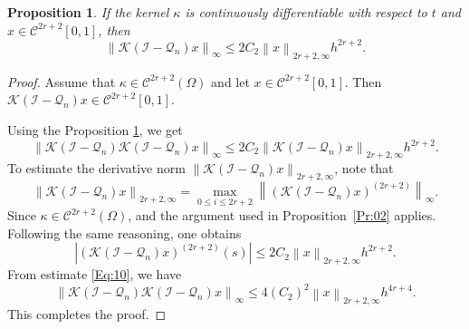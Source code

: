 \documentclass[10pt,a4paper]{amsart}
\newtheorem{proposition}{Proposition}
\newcommand{\norm}[1]{\left\lVert #1\right\rVert}
\begin{document}
\begin{proposition} \label{Pr:01}
	If the kernel  $\kappa$ is continuously differentiable with respect to $t$ 
	and \(x \in \mathcal{C}^{2r+2}[0,1]\), then
	\[
	\norm{\mathcal{K}(\mathcal{I} - \mathcal{Q}_n)x }_\infty 
	\le 2C_2 \norm{x}_{2r+2, \infty} h^{2r + 2}.
	\]
\end{proposition}

\begin{proof}
	Assume that $\kappa \in \mathcal{C}^{2r+2}(\Omega)$ and let
	$x \in \mathcal{C}^{2r+2}[0,1]$. Then
	$
	\mathcal{K}(\mathcal{I}-\mathcal{Q}_n)x \in \mathcal{C}^{2r+2}[0,1].
	$
	
	\noindent
	Using the Proposition \ref{Pr:01}, we get
	\begin{equation}\label{Eq:10}	
		\norm{\mathcal{K}(\mathcal{I} - \mathcal{Q}_n)\mathcal{K}(\mathcal{I} - \mathcal{Q}_n)x}_\infty \le 2C_2 \norm{\mathcal{K}(\mathcal{I} - \mathcal{Q}_n)x}_{2r+2,\infty} h^{2r+2}.  
	\end{equation}
	To estimate the derivative norm $\norm{\mathcal{K}(\mathcal{I}-\mathcal{Q}_n)x}_{2r+2,\infty}$, 
	note that
	\begin{equation*} 
		\norm{\mathcal{K}(\mathcal{I} - \mathcal{Q}_n)x}_{2r+2,\infty} = \max_{0 \leq i \leq 2r + 2} \norm{\left(\mathcal{K}(\mathcal{I} - \mathcal{Q}_n)x\right)^{(2r+2)}}_\infty.
	\end{equation*}
	Since $\kappa \in \mathcal{C}^{2r+2}(\Omega)$, and the argument used in Proposition~\ref{Pr:02} applies. 
	Following the same reasoning, one obtains
	\begin{equation*}
		\left|\left(\mathcal{K}(\mathcal{I} - \mathcal{Q}_n)x\right)^{(2r+2)}(s)\right| \le  2 C_2 \norm{x}_{2r +2, \infty} h^{2r + 2}.
	\end{equation*}
	From estimate \eqref{Eq:10}, we have
	\begin{equation*}	
		\norm{\mathcal{K}(\mathcal{I} - \mathcal{Q}_n)\mathcal{K}(\mathcal{I} - \mathcal{Q}_n)x}_\infty \le 4(C_2)^2  \norm{x}_{2r +2, \infty} h^{4r+4}.
	\end{equation*}
	This completes the proof.
\end{proof}
\end{document}
